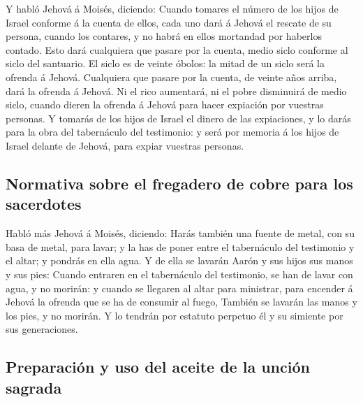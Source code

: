  Y habló Jehová á Moisés, diciendo:  Cuando
tomares el número de los hijos de Israel conforme á la cuenta de ellos,
cada uno dará á Jehová el rescate de su persona, cuando los contares, y
no habrá en ellos mortandad por haberlos contado.  Esto
dará cualquiera que pasare por la cuenta, medio siclo conforme al siclo
del santuario. El siclo es de veinte óbolos: la mitad de un siclo será
la ofrenda á Jehová.  Cualquiera que pasare por la cuenta,
de veinte años arriba, dará la ofrenda á Jehová.  Ni el
rico aumentará, ni el pobre disminuirá de medio siclo, cuando dieren la
ofrenda á Jehová para hacer expiación por vuestras personas.
 Y tomarás de los hijos de Israel el dinero de las
expiaciones, y lo darás para la obra del tabernáculo del testimonio: y
será por memoria á los hijos de Israel delante de Jehová, para expiar
vuestras personas.

\hypertarget{normativa-sobre-el-fregadero-de-cobre-para-los-sacerdotes}{%
\subsection{Normativa sobre el fregadero de cobre para los
sacerdotes}\label{normativa-sobre-el-fregadero-de-cobre-para-los-sacerdotes}}

 Habló más Jehová á Moisés, diciendo:  Harás
también una fuente de metal, con su basa de metal, para lavar; y la has
de poner entre el tabernáculo del testimonio y el altar; y pondrás en
ella agua.  Y de ella se lavarán Aarón y sus hijos sus
manos y sus pies:  Cuando entraren en el tabernáculo del
testimonio, se han de lavar con agua, y no morirán: y cuando se llegaren
al altar para ministrar, para encender á Jehová la ofrenda que se ha de
consumir al fuego,  También se lavarán las manos y los
pies, y no morirán. Y lo tendrán por estatuto perpetuo él y su simiente
por sus generaciones.

\hypertarget{preparaciuxf3n-y-uso-del-aceite-de-la-unciuxf3n-sagrada}{%
\subsection{Preparación y uso del aceite de la unción
sagrada}\label{preparaciuxf3n-y-uso-del-aceite-de-la-unciuxf3n-sagrada}}

